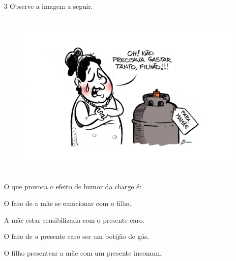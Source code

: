 \num{3} Observe a imagem a seguir.

\begin{figure}[H]
\centering\includegraphics[width=4.86098in,height=3.28333in]{./imgSAEB_6_POR/media/image39.png}
\end{figure}

\noindent O que provoca o efeito de humor da charge é:

\begin{escolha}
\item O fato de a mãe se emocionar com o filho.
\item A mãe estar sensibilizada com o presente caro.
\item O fato de o presente caro ser um botijão de gás.
\item O filho presentear a mãe com um presente incomum.
\end{escolha}



